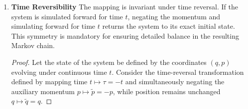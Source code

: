 \documentclass[12pt,oneside]{report}
\theoremstyle{definition}
\theoremstyle{remark}
\begin{document}
\begin{enumerate}
\begin{proof}
Consider the vector field $\mathbf{V}$ governing the flow in phase space, defined as $\mathbf{V} = \left( \frac{dq}{dt}, \frac{dp}{dt} \right)$. The divergence of this vector field is:


\begin{equation}
    \nabla \cdot \mathbf{V} = \sum_{i=1}^d \left( \frac{\partial}{\partial q_i} \frac{dq_i}{dt} + \frac{\partial}{\partial p_i} \frac{dp_i}{dt} \right)
\end{equation}


Substituting Hamilton's equations yields:


\begin{align*}
    \nabla \cdot \mathbf{V} &= \sum_{i=1}^d \left( \frac{\partial}{\partial q_i} \left( \frac{\partial H}{\partial p_i} \right) + \frac{\partial}{\partial p_i} \left( -\frac{\partial H}{\partial q_i} \right) \right) \\
    &= \sum_{i=1}^d \left( \frac{\partial^2 H}{\partial q_i \partial p_i} - \frac{\partial^2 H}{\partial p_i \partial q_i} \right) = 0
\end{align*}


By Clairaut's theorem, the mixed second partial derivatives of $H$ are equal, provided $H$ is $\mathcal{C}^2$ continuous. Thereby, the two terms cancel, and the divergence vanishes ($\nabla \cdot \mathbf{V} = 0$). By Liouville's theorem \cite{neal2011mcmc}, this phase-space volume preservation implies that the determinant of the Jacobian of the Hamiltonian flow is strictly equal to 1, completely bypassing the need to compute complex Jacobian determinants during the Metropolis acceptance step.

\end{proof}
	\item \textbf{Time Reversibility} 
The mapping is invariant under time reversal. If the system is simulated forward for time $t$, negating the momentum and simulating forward for time $t$ returns the system to its exact initial state. This symmetry is mandatory for ensuring detailed balance in the resulting Markov chain.

\begin{proof}
Let the state of the system be defined by the coordinates $(q, p)$ evolving under continuous time $t$. Consider the time-reversal transformation defined by mapping time $t \mapsto \tau = -t$ and simultaneously negating the auxiliary momentum $p \mapsto \tilde{p} = -p$, while position remains unchanged $q \mapsto \tilde{q} = q$. 


\end{proof}
\end{enumerate}
\end{document}
